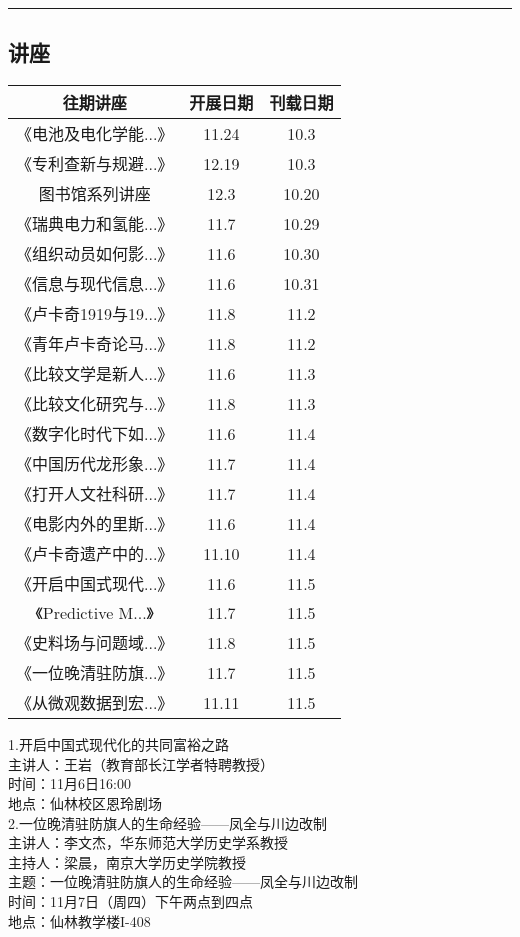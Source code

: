 \documentclass[letterpaper, 12pt]{article}
\begin{document}
\hrule
\pagebreak
\begin{multicols}{2}

\section{讲座}
\begin{tabular}{|c|c|c|}
    \hline
    往期讲座 & 开展日期 & 刊载日期\\
    \hline\hline
    《电池及电化学能...》 & 11.24 & 10.3\\
    《专利查新与规避...》 & 12.19 & 10.3\\
    图书馆系列讲座 & 12.3 & 10.20\\
    《瑞典电力和氢能...》 & 11.7 & 10.29\\
    《组织动员如何影...》 & 11.6 & 10.30\\
    《信息与现代信息...》 & 11.6 & 10.31\\
    《卢卡奇1919与19...》 & 11.8 & 11.2\\
    《青年卢卡奇论马...》 & 11.8 & 11.2\\
    《比较文学是新人...》 & 11.6 & 11.3\\
    《比较文化研究与...》 & 11.8 & 11.3\\
    《数字化时代下如...》 & 11.6 & 11.4\\
    《中国历代龙形象...》 & 11.7 & 11.4\\
    《打开人文社科研...》 & 11.7 & 11.4\\
    《电影内外的里斯...》 & 11.6 & 11.4\\
    《卢卡奇遗产中的...》 & 11.10 & 11.4\\
    《开启中国式现代...》 & 11.6 & 11.5\\
    《Predictive M...》 & 11.7 & 11.5\\
    《史料场与问题域...》 & 11.8 & 11.5\\
    《一位晚清驻防旗...》& 11.7 & 11.5\\
    《从微观数据到宏...》& 11.11 & 11.5\\
    \hline
\end{tabular}

1.开启中国式现代化的共同富裕之路\\
主讲人：王岩（教育部长江学者特聘教授）\\
时间：11月6日16:00\\
地点：仙林校区恩玲剧场\\

2.一位晚清驻防旗人的生命经验——凤全与川边改制\\
主讲人：李文杰，华东师范大学历史学系教授\\
主持人：梁晨，南京大学历史学院教授\\
主题：一位晚清驻防旗人的生命经验——凤全与川边改制\\
时间：11月7日（周四）下午两点到四点\\
地点：仙林教学楼I-408\\


\end{multicols}
\end{document}
